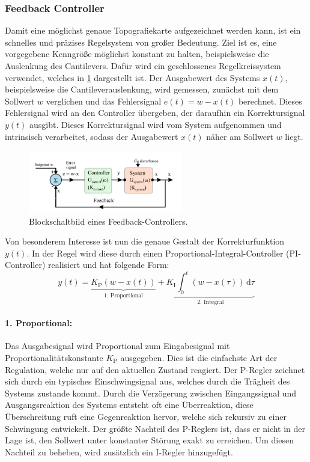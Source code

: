 \subsubsection{Feedback Controller}
Damit eine möglichst genaue Topografiekarte aufgezeichnet werden kann, ist ein schnelles und präzises Regelsystem von großer Bedeutung.
Ziel ist es, eine vorgegebene Kenngröße möglichst konstant zu halten, beispielsweise die Auslenkung des Cantilevers.
Dafür wird ein geschlossenes Regelkreissystem verwendet, welches in \cref{fig:afm_controller} dargestellt ist.
Der Ausgabewert des Systems $x(t)$, beispielsweise die Cantileverauslenkung, wird gemessen, zunächst mit dem
Sollwert $w$ verglichen und das Fehlersignal $e(t)=w-x(t)$ berechnet.
Dieses Fehlersignal wird an den Controller übergeben, der daraufhin ein Korrektursignal $y(t)$ ausgibt.
Dieses Korrektursignal wird vom System aufgenommen und intrinsisch verarbeitet, sodass der Ausgabewert $x(t)$ näher am
Sollwert $w$ liegt.\autocite[99-101]{afm-buch}
\begin{figure}
    \centering
    \includegraphics[width=0.6\textwidth]{../assets/messmethoden/afm/03_controller.png}
    \caption{Blockschaltbild eines Feedback-Controllers. }
    \label{fig:afm_controller}
\end{figure}
Von besonderem Interesse ist nun die genaue Gestalt der Korrekturfunktion $y(t)$.
In der Regel wird diese durch einen Proportional-Integral-Controller (PI-Controller) realisiert und hat folgende Form:
\begin{equation*}
    y(t)=\underbrace{ K_{\mathrm{P}}(w-x(t)) }_{ \text{1. Proportional} }+\underbrace{ K_{\mathrm{I}}\int_{0}^{t}
        (w-x(\tau)) \, \mathrm{d}\tau }_{ \text{2. Integral} }
\end{equation*}

\paragraph{1. Proportional:}
Das Ausgabesignal wird Proportional zum Eingabesignal mit Proportionalitätskonstante $K_{\mathrm{P}}$ ausgegeben.
Dies ist die einfachste Art der Regulation, welche nur auf den aktuellen Zustand reagiert.
Der P-Regler zeichnet sich durch ein typisches Einschwingsignal aus, welches durch die Trägheit des Systems zustande kommt.
Durch die Verzögerung zwischen Eingangssignal und Ausgangsreaktion des Systems entsteht oft eine Überreaktion,
diese Überschreitung ruft eine Gegenreaktion hervor, welche sich rekursiv zu einer Schwingung entwickelt.
Der größte Nachteil des P-Reglers ist, dass er nicht in der Lage ist, den Sollwert unter konstanter Störung
exakt zu erreichen.
Um diesen Nachteil zu beheben, wird zusätzlich ein I-Regler hinzugefügt.\autocite[101-102]{afm-buch}


